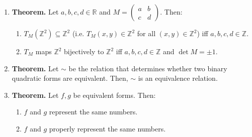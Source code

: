 \documentclass[11pt]{article}
\theoremstyle{definition}
\theoremstyle{named}
\begin{document}
\begin{enumerate}
    \item \textbf{Theorem. } Let $a,b,c,d \in \mathbb{R}$ and $M=\begin{pmatrix}
        a & b\\
        c & d
    \end{pmatrix}$. Then: 
    \begin{enumerate}
        \item $T_M(\mathbb{Z}^2) \subseteq \mathbb{Z}^2$ (i.e. $T_M(x,y) \in \mathbb{Z}^2$ for all $(x,y) \in \mathbb{Z}^2$) iff $a,b,c,d \in \mathbb{Z}$. 
        \item $T_M$ maps $\mathbb{Z}^2$ bijectively to $\mathbb{Z}^2$ iff $a,b,c,d \in \mathbb{Z}$ and $\det M = \pm 1$. 
    \end{enumerate}
    \item \textbf{Theorem. } Let $\sim$ be the relation that determines whether two binary quadratic forms are equivalent. Then, $\sim$ is an equivalence relation. 
    \item \textbf{Theorem. } Let $f,g$ be equivalent forms. Then: 
    \begin{enumerate}
        \item $f$ and $g$ represent the same numbers. 
        \item $f$ and $g$ properly represent the same numbers. 
    \end{enumerate}
\end{enumerate}
\end{document}
